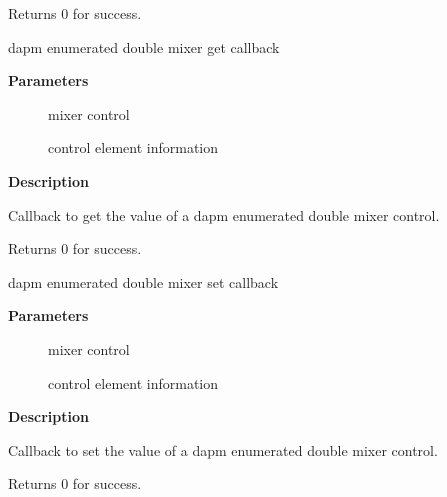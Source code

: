 \documentclass[a4paper,8pt,english]{sphinxmanual}
\begin{document}
Returns 0 for success.

\begin{fulllineitems}
\label{sound/kernel-api/alsa-driver-api:c.snd_soc_dapm_get_enum_double}
dapm enumerated double mixer get callback

\end{fulllineitems}


\textbf{Parameters}
\begin{description}
\item[{}] \leavevmode
mixer control

\item[{}] \leavevmode
control element information

\end{description}

\textbf{Description}

Callback to get the value of a dapm enumerated double mixer control.

Returns 0 for success.

\begin{fulllineitems}
\label{sound/kernel-api/alsa-driver-api:c.snd_soc_dapm_put_enum_double}
dapm enumerated double mixer set callback

\end{fulllineitems}


\textbf{Parameters}
\begin{description}
\item[{}] \leavevmode
mixer control

\item[{}] \leavevmode
control element information

\end{description}

\textbf{Description}

Callback to set the value of a dapm enumerated double mixer control.

Returns 0 for success.
\end{document}
